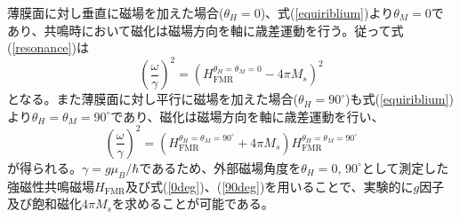 薄膜面に対し垂直に磁場を加えた場合($\theta_H=0$)、式(\ref{equiriblium})より$\theta_M=0$であり、共鳴時において磁化は磁場方向を軸に歳差運動を行う。従って式(\ref{resonance})は
\begin{equation}
\left(\frac{\omega}{\gamma}\right)^2=\left(H_\text{FMR }^{\theta_H=\theta_M=0}-4\pi M_s \right)^2\label{0deg}
\end{equation}
となる。また薄膜面に対し平行に磁場を加えた場合($\theta_H=90^\circ$)も式(\ref{equiriblium})より$\theta_H=\theta_M=90^\circ$であり、磁化は磁場方向を軸に歳差運動を行い、
\begin{equation}
\left(\frac{\omega}{\gamma}\right)^2=\left(H_\text{FMR}^{\theta_H=\theta_M=90^\circ}+4\pi M_s \right)H_\text{FMR}^{\theta_H=\theta_M=90^\circ}\label{90deg}
\end{equation}
が得られる。$\gamma=g\mu_B / \hbar$であるため、外部磁場角度を$\theta_H=0$, $90^\circ$として測定した強磁性共鳴磁場$H_\text{FMR}$及び式(\ref{0deg})、(\ref{90deg})を用いることで、実験的に$g$因子及び飽和磁化$4\pi M_s$を求めることが可能である。



